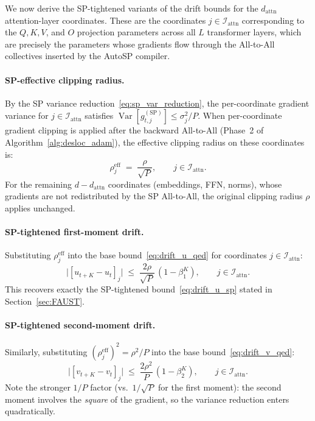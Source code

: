 \documentclass{article}
\begin{document}
We now derive the SP-tightened variants of the drift bounds for the
$d_{\text{attn}}$ attention-layer coordinates. These are the coordinates
$j \in \mathcal{I}_{\text{attn}}$ corresponding to the $Q, K, V$, and $O$
projection parameters across all $L$ transformer layers, which are precisely
the parameters whose gradients flow through the All-to-All collectives
inserted by the AutoSP compiler.

\paragraph{SP-effective clipping radius.}
By the SP variance reduction~\eqref{eq:sp_var_reduction}, the per-coordinate
gradient variance for $j \in \mathcal{I}_{\text{attn}}$ satisfies
$\operatorname{Var}[g_{t,j}^{(\text{SP})}] \leq \sigma_j^2 / P$.
When per-coordinate gradient clipping is applied after the backward All-to-All
(Phase~2 of Algorithm~\ref{alg:desloc_adam}), the effective clipping radius
on these coordinates is:
\begin{equation}
\rho_j^{\text{eff}} \;=\; \frac{\rho}{\sqrt{P}}, \qquad j \in \mathcal{I}_{\text{attn}}.
\label{eq:rho_eff_def}
\end{equation}
For the remaining $d - d_{\text{attn}}$ coordinates (embeddings, FFN, norms),
whose gradients are not redistributed by the SP All-to-All, the original
clipping radius $\rho$ applies unchanged.

\paragraph{SP-tightened first-moment drift.}
Substituting $\rho_j^{\text{eff}}$ into the base
bound~\eqref{eq:drift_u_qed} for coordinates $j \in \mathcal{I}_{\text{attn}}$:
\begin{equation}
\bigl|[u_{t+K} - u_t]_j\bigr|
\;\leq\; \frac{2\rho}{\sqrt{P}}\,(1 - \beta_1^K),
\qquad j \in \mathcal{I}_{\text{attn}}.
\label{eq:drift_u_sp_derived}
\end{equation}
This recovers exactly the SP-tightened bound~\eqref{eq:drift_u_sp}
stated in Section~\ref{sec:FAUST}.

\paragraph{SP-tightened second-moment drift.}
Similarly, substituting $(\rho_j^{\text{eff}})^2 = \rho^2/P$ into the
base bound~\eqref{eq:drift_v_qed}:
\begin{equation}
\bigl|[v_{t+K} - v_t]_j\bigr|
\;\leq\; \frac{2\rho^2}{P}\,(1 - \beta_2^K),
\qquad j \in \mathcal{I}_{\text{attn}}.
\label{eq:drift_v_sp_derived}
\end{equation}
Note the stronger $1/P$ factor (vs.\ $1/\sqrt{P}$ for the first moment):
the second moment involves the \emph{square} of the gradient, so the
variance reduction enters quadratically.
\end{document}
